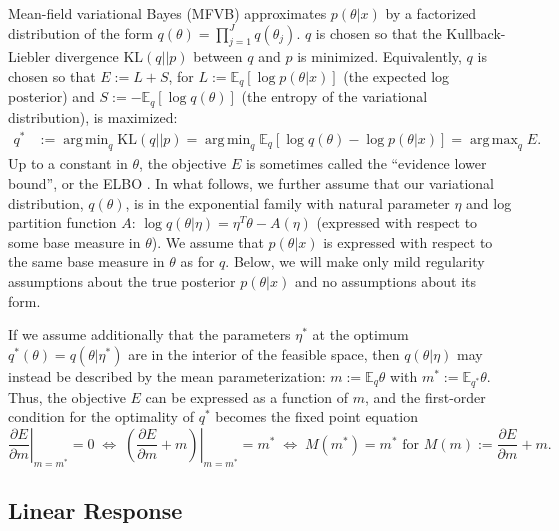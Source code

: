 \documentclass{article}\usepackage[]{graphicx}\usepackage[]{color}
\newcommand{\npq}{\eta} %
\newcommand{\mpq}{m} %
\newcommand{\mpopt}{m^*} %
\newcommand{\npopt}{\eta^*} %
\newcommand{\klshort}{E}
\theoremstyle{plain}
\newcommand{\kl}{\textrm{KL}}
\DeclareMathOperator*{\argmin}{arg\,min}
\DeclareMathOperator*{\argmax}{arg\,max}
\newcommand{\mbe}{\mathbb{E}}
\begin{document}
Mean-field variational Bayes (MFVB) approximates $p(\theta | x)$ by a factorized
distribution of the form $q(\theta) = \prod_{j=1}^{J} q(\theta_j)$. $q$ is
chosen so that the Kullback-Liebler divergence $\kl(q || p)$ between $q$ and $p$
is minimized. Equivalently, $q$ is chosen so that $\klshort := L + S$, for $L :=
\mbe_q[\log p (\theta | x)]$ (the expected log posterior) and $S := -
\mbe_q[\log q(\theta)]$ (the entropy of the variational distribution),
%
is maximized:
\begin{align} \label{eq:kl}
  q^{*} &:= \argmin_{q} \kl(q || p) = \argmin_{q} \mbe_{q} \left[ \log q(\theta) - \log p(\theta | x)  \right] = \argmax_{q} E.
\end{align}
%
Up to a constant in $\theta$, the objective $\klshort$ is sometimes called the
``evidence lower bound'', or the ELBO \citep{bishop:2006:pattern}. In what
follows, we further assume that our variational distribution,
$q\left(\theta\right)$, is in the exponential family with natural parameter
$\npq$ and log partition function $A$:
%
$
\log q\left(\theta \vert \npq \right) =
  \npq^{T}\theta - A\left(\npq\right)
$
%
(expressed with respect to some base measure in $\theta$). We assume that
$p\left(\theta \vert x\right)$ is expressed with respect to the same base
measure in $\theta$ as for $q$. Below, we will make only mild regularity
assumptions about the true posterior $p(\theta | x)$ and no assumptions about
its form.

If we assume additionally that the parameters $\npopt$ at the optimum
$q^*(\theta) = q(\theta | \npopt)$ are in the interior of the feasible space,
then $q(\theta | \npq)$ may instead be described by the mean parameterization:
$\mpq := \mbe_{q} \theta$ with $\mpopt := \mbe_{q^*} \theta$. Thus, the
objective $\klshort$ can be expressed as a function of $m$, and the first-order
condition for the optimality of $q^*$ becomes the fixed point equation
%
\begin{equation}
  \label{eq:fixed_pt}
  \left. \frac{\partial \klshort}{\partial \mpq} \right|_{\mpq = \mpopt} = 0
  \;
  \Leftrightarrow
  \;
  \left. \left( \frac{\partial \klshort}{\partial \mpq} + \mpq \right) \right|_{\mpq = \mpopt} = \mpopt
  \;
  \Leftrightarrow
  \;
  M(\mpopt) = \mpopt
  \textrm{ for } M(\mpq) := \frac{\partial \klshort}{\partial \mpq} + \mpq.
\end{equation}

\subsection{Linear Response}\label{sec:lr_subsection}
\end{document}
